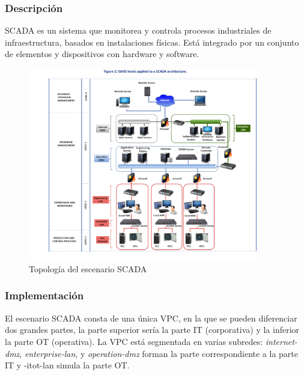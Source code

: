 \subsubsection{Descripción}
  SCADA es un sistema que monitorea y controla procesos industriales de infraestructura, basados en instalaciones físicas. Está integrado por un conjunto de elementos y dispositivos con hardware y software. 

  \begin{figure}[h]
  \centering
  \includegraphics[width=0.9\textwidth]{../imgs/desarrollo/escenarios-de-red/SCADA/SCADA_Network_2.PNG}
  \caption{Topología del escenario SCADA}
  \label{fig:scada-t}
  \end{figure}

  \clearpage
\subsubsection{Implementación}
  El escenario SCADA consta de una única VPC, en la que se pueden diferenciar dos grandes partes, la parte superior sería la parte IT (corporativa) y la inferior la parte OT (operativa). La VPC está segmentada en varias subredes: \textit{internet-dmz}, \textit{enterprise-lan}, y \textit{operation-dmz} forman la parte correspondiente a la parte IT y \text-it{ot-lan} simula la parte OT. 

